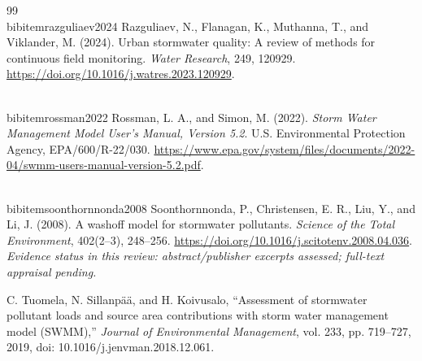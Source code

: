 \documentclass[journal]{IEEEtran}
\begin{document}
\begin{thebibliography}{99}
\\bibitem{razguliaev2024}
Razguliaev, N., Flanagan, K., Muthanna, T., and Viklander, M. (2024).
Urban stormwater quality: A review of methods for continuous field monitoring.
\textit{Water Research}, 249, 120929.
\url{https://doi.org/10.1016/j.watres.2023.120929}.

\\bibitem{rossman2022}
Rossman, L. A., and Simon, M. (2022).
\textit{Storm Water Management Model User's Manual, Version 5.2}.
U.S. Environmental Protection Agency, EPA/600/R-22/030.
\url{https://www.epa.gov/system/files/documents/2022-04/swmm-users-manual-version-5.2.pdf}.

\\bibitem{soonthornnonda2008}
Soonthornnonda, P., Christensen, E. R., Liu, Y., and Li, J. (2008).
A washoff model for stormwater pollutants.
\textit{Science of the Total Environment}, 402(2--3), 248--256.
\url{https://doi.org/10.1016/j.scitotenv.2008.04.036}.
\textit{Evidence status in this review: abstract/publisher excerpts assessed; full-text appraisal pending.}

C. Tuomela, N. Sillanpää, and H. Koivusalo, ``Assessment of stormwater pollutant loads and source area contributions with storm water management model (SWMM),'' \textit{Journal of Environmental Management}, vol. 233, pp. 719--727, 2019, doi: 10.1016/j.jenvman.2018.12.061.

\end{thebibliography}
\end{document}
